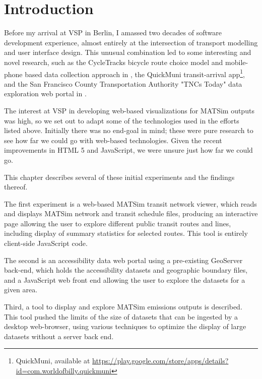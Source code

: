\hypertarget{server-experiments-introduction}{%
\section{Introduction}\label{server-experiments-intro}}

Before my arrival at VSP in Berlin, I amassed two decades of software development experience, almost entirely at the intersection of transport modelling and user interface design. This unusual combination led to some interesting and novel research, such as the CycleTracks bicycle route choice model and mobile-phone based data collection approach in \cite{HoodSallCharlton2011BicycleRouteChoiceSanFrancisco}, the QuickMuni transit-arrival app\footnote{QuickMuni, available at \url{https://play.google.com/store/apps/details?id=com.worldofbilly.quickmuni}}, and the San Francisco County Transportation Authority "TNCs Today" data exploration web portal in \cite{erhardt2019transportation}.

The interest at VSP in developing web-based visualizations for MATSim outputs was high, so we set out to adapt some of the technologies used in the efforts listed above. Initially there was no end-goal in mind; these were pure research to see how far we could go with web-based technologies. Given the recent improvements in HTML 5 and JavaScript, we were unsure just how far we could go.

This chapter describes several of these initial experiments and the findings thereof.

The first experiment is a web-based MATSim transit network viewer, which reads and displays MATSim network and transit schedule files, producing an interactive page allowing the user to explore different public transit routes and lines, including display of summary statistics for selected routes. This tool is entirely client-side JavaScript code.

The second is an accessibility data web portal using a pre-existing GeoServer back-end, which holds the accessibility datasets and geographic boundary files, and a JavaScript web front end allowing the user to explore the datasets for a given area.

Third, a tool to display and explore MATSim emissions outputs is described. This tool pushed the limits of the size of datasets that can be ingested by a desktop web-browser, using various techniques to optimize the display of large datasets without a server back end.

